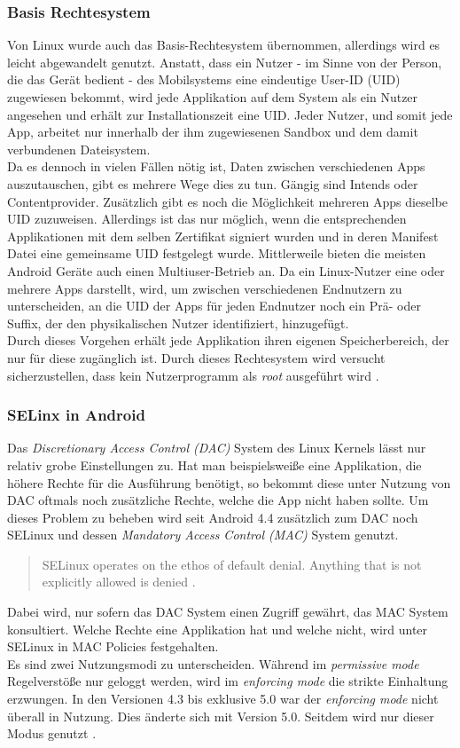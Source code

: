 	\subsubsection{Basis Rechtesystem}\label{sec:BasisRechteSystem}
	Von Linux wurde auch das Basis-Rechtesystem übernommen, allerdings wird es
	leicht abgewandelt genutzt. Anstatt, dass ein Nutzer - im Sinne von der Person,
	die das Gerät bedient - des Mobilsystems eine eindeutige User-ID (UID)
	zugewiesen bekommt, wird jede Applikation auf dem System als ein Nutzer
	angesehen und erhält zur Installationszeit eine UID. Jeder Nutzer, und somit
	jede App, arbeitet nur innerhalb der ihm zugewiesenen Sandbox und dem damit
	verbundenen Dateisystem.\\
	Da es dennoch in vielen Fällen nötig ist, Daten zwischen verschiedenen Apps
	auszutauschen, gibt es mehrere Wege dies zu tun. Gängig sind
	Intends oder Contentprovider. Zusätzlich gibt es noch die Möglichkeit mehreren
	Apps dieselbe UID zuzuweisen. Allerdings ist das nur möglich, wenn die
	entsprechenden Applikationen mit dem selben Zertifikat signiert wurden und in
	deren Manifest Datei eine gemeinsame UID festgelegt wurde.
	Mittlerweile bieten die meisten Android Geräte auch einen Multiuser-Betrieb
	an. Da ein Linux-Nutzer eine oder mehrere Apps darstellt, wird, um zwischen
	verschiedenen Endnutzern zu unterscheiden, an die UID der Apps für jeden
	Endnutzer noch ein Prä- oder Suffix, der den physikalischen Nutzer
	identifiziert, hinzugefügt.\\
	Durch dieses Vorgehen erhält jede Applikation ihren eigenen Speicherbereich,
	der nur für diese zugänglich ist. Durch dieses Rechtesystem wird versucht
	sicherzustellen, dass kein Nutzerprogramm als \textit{root} ausgeführt wird
	\cite[S. 12-14]{Elenkov2014}.
	
	\subsubsection{SELinx in Android}
	Das \textit{Discretionary Access Control (DAC)} System des Linux Kernels lässt
	nur relativ grobe Einstellungen zu. Hat man beispielsweiße eine Applikation,
	die höhere Rechte für die Ausführung benötigt, so bekommt diese unter Nutzung
	von DAC oftmals noch zusätzliche Rechte, welche die App nicht haben sollte.	Um
	dieses Problem zu beheben wird seit Android 4.4 zusätzlich zum DAC noch
	SELinux und dessen \textit{Mandatory Access Control (MAC)} System genutzt.
	\begin{quote}
	SELinux operates on the ethos of default denial. Anything that is not
	explicitly allowed is denied \cite{SELinuxAndroid}.
	\end{quote}
	Dabei wird, nur sofern das DAC System einen Zugriff gewährt, das MAC System
	konsultiert. Welche Rechte eine Applikation hat und welche nicht, wird unter
	SELinux in MAC Policies festgehalten.\\
	Es sind zwei Nutzungsmodi zu unterscheiden. Während im \textit{permissive
	mode} Regelverstöße nur geloggt werden, wird im \textit{enforcing mode} die
	strikte Einhaltung erzwungen. In den Versionen 4.3 bis exklusive 5.0 war der
	\textit{enforcing mode} nicht überall in Nutzung. Dies änderte sich mit
	Version 5.0. Seitdem wird nur dieser Modus genutzt \cite{SELinuxAndroid}.	